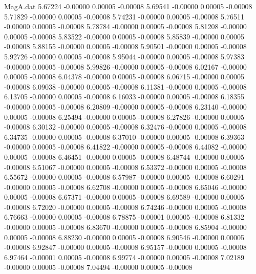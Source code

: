 \begin{filecontents}{MagA.dat}
   5.67224   -0.00000    0.00005   -0.00008
   5.69541   -0.00000    0.00005   -0.00008
   5.71829   -0.00000    0.00005   -0.00008
   5.74231   -0.00000    0.00005   -0.00008
   5.76511   -0.00000    0.00005   -0.00008
   5.78784   -0.00000    0.00005   -0.00008
   5.81208   -0.00000    0.00005   -0.00008
   5.83522   -0.00000    0.00005   -0.00008
   5.85839   -0.00000    0.00005   -0.00008
   5.88155   -0.00000    0.00005   -0.00008
   5.90501   -0.00000    0.00005   -0.00008
   5.92726   -0.00000    0.00005   -0.00008
   5.95044   -0.00000    0.00005   -0.00008
   5.97383   -0.00000    0.00005   -0.00008
   5.99826   -0.00000    0.00005   -0.00008
   6.02167   -0.00000    0.00005   -0.00008
   6.04378   -0.00000    0.00005   -0.00008
   6.06715   -0.00000    0.00005   -0.00008
   6.09038   -0.00000    0.00005   -0.00008
   6.11381   -0.00000    0.00005   -0.00008
   6.13705   -0.00000    0.00005   -0.00008
   6.16033   -0.00000    0.00005   -0.00008
   6.18355   -0.00000    0.00005   -0.00008
   6.20809   -0.00000    0.00005   -0.00008
   6.23140   -0.00000    0.00005   -0.00008
   6.25494   -0.00000    0.00005   -0.00008
   6.27826   -0.00000    0.00005   -0.00008
   6.30132   -0.00000    0.00005   -0.00008
   6.32476   -0.00000    0.00005   -0.00008
   6.34735   -0.00000    0.00005   -0.00008
   6.37010   -0.00000    0.00005   -0.00008
   6.39363   -0.00000    0.00005   -0.00008
   6.41822   -0.00000    0.00005   -0.00008
   6.44082   -0.00000    0.00005   -0.00008
   6.46451   -0.00000    0.00005   -0.00008
   6.48744   -0.00000    0.00005   -0.00008
   6.51067   -0.00000    0.00005   -0.00008
   6.53372   -0.00000    0.00005   -0.00008
   6.55672   -0.00000    0.00005   -0.00008
   6.57987   -0.00000    0.00005   -0.00008
   6.60291   -0.00000    0.00005   -0.00008
   6.62708   -0.00000    0.00005   -0.00008
   6.65046   -0.00000    0.00005   -0.00008
   6.67371   -0.00000    0.00005   -0.00008
   6.69589   -0.00000    0.00005   -0.00008
   6.72020   -0.00000    0.00005   -0.00008
   6.74246   -0.00000    0.00005   -0.00008
   6.76663   -0.00000    0.00005   -0.00008
   6.78875   -0.00001    0.00005   -0.00008
   6.81332   -0.00000    0.00005   -0.00008
   6.83670   -0.00000    0.00005   -0.00008
   6.85904   -0.00000    0.00005   -0.00008
   6.88230   -0.00000    0.00005   -0.00008
   6.90546   -0.00000    0.00005   -0.00008
   6.92847   -0.00000    0.00005   -0.00008
   6.95157   -0.00000    0.00005   -0.00008
   6.97464   -0.00001    0.00005   -0.00008
   6.99774   -0.00000    0.00005   -0.00008
   7.02189   -0.00000    0.00005   -0.00008
   7.04494   -0.00000    0.00005   -0.00008

\end{filecontents}
